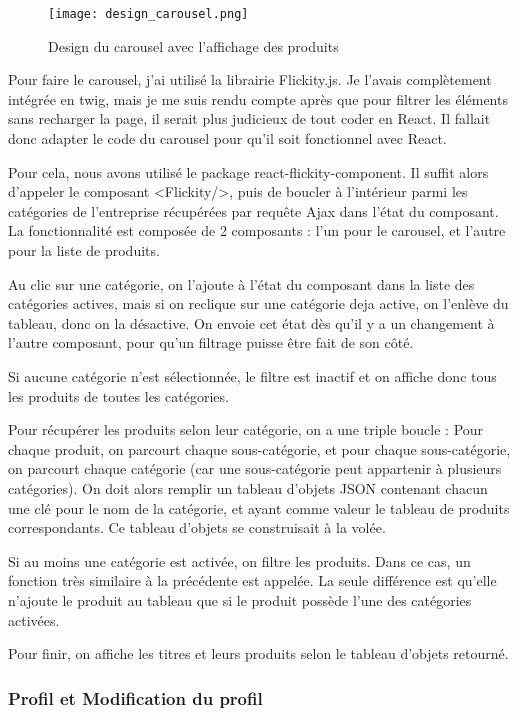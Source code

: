 \begin{figure}[H]
    \texttt{[image: design\_carousel.png]}
    \caption{Design du carousel avec l'affichage des produits}
\end{figure}

Pour faire le carousel, j'ai utilisé la librairie Flickity.js. 
Je l'avais complètement intégrée en twig, mais je me suis rendu compte après que pour filtrer les éléments sans recharger la page, il serait plus judicieux de tout coder en React.
Il fallait donc adapter le code du carousel pour qu'il soit fonctionnel avec React.

Pour cela, nous avons utilisé le package react-flickity-component. Il suffit alors d'appeler le composant <Flickity/>, puis de boucler à l'intérieur parmi les catégories de l'entreprise récupérées par requête Ajax dans l'état du composant.\\

La fonctionnalité est composée de 2 composants : l'un pour le carousel, et l'autre pour la liste de produits.

Au clic sur une catégorie, on l'ajoute à l'état du composant dans la liste des catégories actives, mais si on reclique sur une catégorie deja active, on l'enlève du tableau, donc on la désactive. On envoie cet état dès qu'il y a un changement à l'autre composant, pour qu'un filtrage puisse être fait de son côté.

Si aucune catégorie n'est sélectionnée, le filtre est inactif et on affiche donc tous les produits de toutes les catégories.

Pour récupérer les produits selon leur catégorie, on a une triple boucle : Pour chaque produit, on parcourt chaque sous-catégorie, et pour chaque sous-catégorie, on parcourt chaque catégorie (car une sous-catégorie peut appartenir à plusieurs catégories).
On doit alors remplir un tableau d'objets JSON contenant chacun une clé pour le nom de la catégorie, et ayant comme valeur le tableau de produits correspondants. Ce tableau d'objets se construisait à la volée.

Si au moins une catégorie est activée, on filtre les produits. Dans ce cas, un fonction très similaire à la précédente est appelée. La seule différence est qu'elle n'ajoute le produit au tableau que si le produit possède l'une des catégories activées.

Pour finir, on affiche les titres et leurs produits selon le tableau d'objets retourné.


\subsubsection{Profil et Modification du profil}


